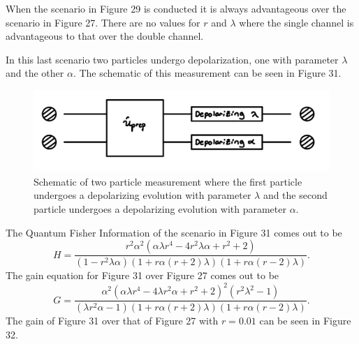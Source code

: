 \documentclass[twocolumn]{article}
\begin{document}
\newline
When the scenario in Figure 29 is conducted it is always advantageous over the scenario in Figure 27. There are no values for $r$ and $\lambda$ where the single channel is advantageous to that over the double channel.

In this last scenario two particles undergo depolarization, one with parameter $\lambda$ and the other $\alpha$. The schematic of this measurement can be seen in Figure 31.
\begin{figure}[h]
\begin{center}
\includegraphics[width=0.65\linewidth]{Depolarizing-Double-Channel-Alpha-and-Lambda-Schematic.jpg}
\caption{Schematic of two particle measurement where the first particle undergoes a depolarizing evolution with parameter $\lambda$ and the second particle undergoes a depolarizing evolution with parameter $\alpha$.}
\end{center}
\end{figure}
\newline
The Quantum Fisher Information of the scenario in Figure 31 comes out to be
\begin{equation}\label{eq:109}
H=\frac{r^2\alpha^2(\alpha\lambda r^4-4r^2\lambda\alpha+r^2+2)}{(1-r^2\lambda\alpha)(1+r\alpha(r+2)\lambda)(1+r\alpha(r-2)\lambda)}.
\end{equation}
The gain equation for Figure 31 over Figure 27 comes out to be
\begin{equation}\label{eq:110}
G=\frac{\alpha^2(\alpha\lambda r^4-4\lambda r^2\alpha+r^2+2)^2(r^2\lambda^2-1)}{(\lambda r^2\alpha-1)(1+r\alpha(r+2)\lambda)(1+r\alpha(r-2)\lambda)}.
\end{equation}
The gain of Figure 31 over that of Figure 27 with $r=0.01$ can be seen in Figure 32.
\end{document}
